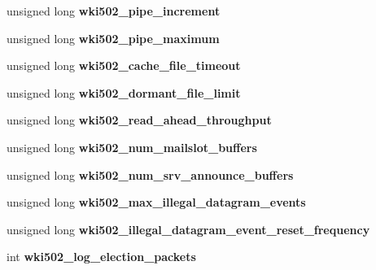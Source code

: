 \begin{DoxyCompactItemize}
unsigned long {\bfseries wki502\+\_\+pipe\+\_\+increment}
\item 
\mbox{\label{struct___w_k_s_t_a___i_n_f_o__502_a548452f06948d270ecdc9485fd6b8376}} 
unsigned long {\bfseries wki502\+\_\+pipe\+\_\+maximum}
\item 
\mbox{\label{struct___w_k_s_t_a___i_n_f_o__502_abf1393a6249270ec9294a8cc56a95dbf}} 
unsigned long {\bfseries wki502\+\_\+cache\+\_\+file\+\_\+timeout}
\item 
\mbox{\label{struct___w_k_s_t_a___i_n_f_o__502_a7889c46af3e048150e78d04a44ea3d2b}} 
unsigned long {\bfseries wki502\+\_\+dormant\+\_\+file\+\_\+limit}
\item 
\mbox{\label{struct___w_k_s_t_a___i_n_f_o__502_a7326727c4a874d31c87a53d97bdb9fea}} 
unsigned long {\bfseries wki502\+\_\+read\+\_\+ahead\+\_\+throughput}
\item 
\mbox{\label{struct___w_k_s_t_a___i_n_f_o__502_aaed1f830bf7a80e4d797224308fc66d1}} 
unsigned long {\bfseries wki502\+\_\+num\+\_\+mailslot\+\_\+buffers}
\item 
\mbox{\label{struct___w_k_s_t_a___i_n_f_o__502_a088c1739053d2faebd6a44bca7f1ea3f}} 
unsigned long {\bfseries wki502\+\_\+num\+\_\+srv\+\_\+announce\+\_\+buffers}
\item 
\mbox{\label{struct___w_k_s_t_a___i_n_f_o__502_a578834e99dc586efff46fb6d5da461b2}} 
unsigned long {\bfseries wki502\+\_\+max\+\_\+illegal\+\_\+datagram\+\_\+events}
\item 
\mbox{\label{struct___w_k_s_t_a___i_n_f_o__502_a0b39d1d972717392c05316e2a697cb56}} 
unsigned long {\bfseries wki502\+\_\+illegal\+\_\+datagram\+\_\+event\+\_\+reset\+\_\+frequency}
\item 
\mbox{\label{struct___w_k_s_t_a___i_n_f_o__502_aeafa291e952e41f4f4780f68b2242d3a}} 
int {\bfseries wki502\+\_\+log\+\_\+election\+\_\+packets}

\end{DoxyCompactItemize}
